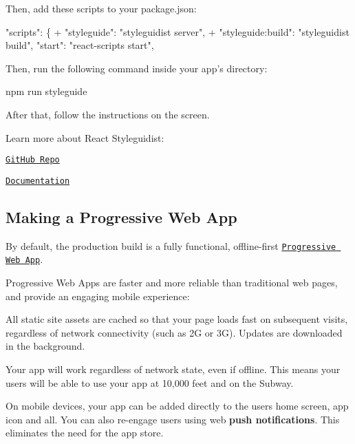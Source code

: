Then, add these scripts to your {\ttfamily package.\+json}\+:


\begin{DoxyCode}
   "scripts": \{
+    "styleguide": "styleguidist server",
+    "styleguide:build": "styleguidist build",
     "start": "react-scripts start",
\end{DoxyCode}


Then, run the following command inside your app’s directory\+:


\begin{DoxyCode}
npm run styleguide
\end{DoxyCode}


After that, follow the instructions on the screen.

Learn more about React Styleguidist\+:


\begin{DoxyItemize}
\item \href{https://github.com/styleguidist/react-styleguidist}{\tt Git\+Hub Repo}
\item \href{https://react-styleguidist.js.org/docs/getting-started.html}{\tt Documentation}
\end{DoxyItemize}

\subsection*{Making a Progressive Web App}

By default, the production build is a fully functional, offline-\/first \href{https://developers.google.com/web/progressive-web-apps/}{\tt Progressive Web App}.

Progressive Web Apps are faster and more reliable than traditional web pages, and provide an engaging mobile experience\+:


\begin{DoxyItemize}
\item All static site assets are cached so that your page loads fast on subsequent visits, regardless of network connectivity (such as 2G or 3G). Updates are downloaded in the background.
\item Your app will work regardless of network state, even if offline. This means your users will be able to use your app at 10,000 feet and on the Subway.
\item On mobile devices, your app can be added directly to the user\textquotesingle{}s home screen, app icon and all. You can also re-\/engage users using web {\bfseries push notifications}. This eliminates the need for the app store.
\end{DoxyItemize}

